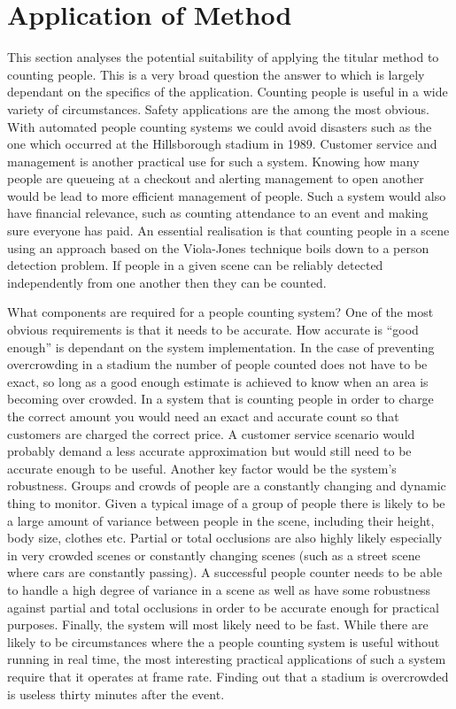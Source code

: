 \documentclass[conference]{IEEEtran}
\begin{document}
\section{Application of Method} \label{sec:application-of-method}
This section analyses the potential suitability of applying the titular method to counting people. This is a very broad question the answer to which is largely dependant on the specifics of the application. Counting people is useful in a wide variety of circumstances. Safety applications are the among the most obvious. With automated people counting systems we could avoid disasters such as the one which occurred at the Hillsborough stadium in 1989. Customer service and management is another practical use for such a system. Knowing how many people are queueing at a checkout and alerting management to open another would be lead to more efficient management of people. Such a system would also have financial relevance, such as counting attendance to an event and making sure everyone has paid. An essential realisation is that counting people in a scene using an approach based on the Viola-Jones technique boils down to a person detection problem. If people in a given scene can be reliably detected independently from one another then they can be counted.

What components are required for a people counting system? One of the most obvious requirements is that it needs to be accurate. How accurate is ``good enough'' is dependant on the system implementation. In the case of preventing overcrowding in a stadium the number of people counted does not have to be exact, so long as a good enough estimate is achieved to know when an area is becoming over crowded. In a system that is counting people in order to charge the correct amount you would need an exact and accurate count so that customers are charged the correct price. A customer service scenario would probably demand a less accurate approximation but would still need to be accurate enough to be useful. Another key factor would be the system's robustness. Groups and crowds of people are a constantly changing and dynamic thing to monitor. Given a typical image of a group of people there is likely to be a large amount of variance between people in the scene, including their height, body size, clothes etc. Partial or total occlusions are also highly likely especially in very crowded scenes or constantly changing scenes (such as a street scene where cars are constantly passing). A successful people counter needs to be able to handle a high degree of variance in a scene as well as have some robustness against partial and total occlusions in order to be accurate enough for practical purposes. Finally, the system will most likely need to be fast. While there are likely to be circumstances where the a people counting system is useful without running in real time, the most interesting practical applications of such a system require that it operates at frame rate. Finding out that a stadium is overcrowded is useless thirty minutes after the event.
\end{document}
